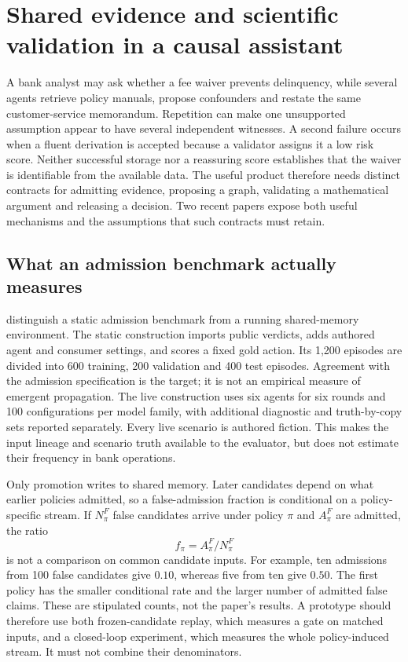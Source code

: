 \section{Shared evidence and scientific validation in a causal assistant}
\label{exec23:admit-scope}
A bank analyst may ask whether a fee waiver prevents delinquency, while several
agents retrieve policy manuals, propose confounders and restate the same
customer-service memorandum. Repetition can make one unsupported assumption
appear to have several independent witnesses. A second failure occurs when
a fluent derivation is accepted because a validator assigns it a low risk
score. Neither successful storage nor a reassuring score establishes that the
waiver is identifiable from the available data. The useful product therefore
needs distinct contracts for admitting evidence, proposing a graph, validating
a mathematical argument and releasing a decision. Two recent papers expose
both useful mechanisms and the assumptions that such contracts must retain.

\subsection{What an admission benchmark actually measures}
\label{exec23:admit-memory}
\citet{exec23_epistemic_admission} distinguish a static admission benchmark
from a running shared-memory environment. The static construction imports
public verdicts, adds authored agent and consumer settings, and scores a fixed
gold action. Its 1,200 episodes are divided into 600 training, 200 validation
and 400 test episodes. Agreement with the admission specification is the
target; it is not an empirical measure of emergent propagation. The live
construction uses six agents for six rounds and 100 configurations per model
family, with additional diagnostic and truth-by-copy sets reported separately.
Every live scenario is authored fiction. This makes the input lineage and
scenario truth available to the evaluator, but does not estimate their
frequency in bank operations.

Only promotion writes to shared memory. Later candidates depend on what
earlier policies admitted, so a false-admission fraction is conditional on a
policy-specific stream. If $N_\pi^F$ false candidates arrive under policy
$\pi$ and $A_\pi^F$ are admitted, the ratio
\begin{equation}
 f_\pi=A_\pi^F/N_\pi^F
 \label{exec23:admit-stream}
\end{equation}
is not a comparison on common candidate inputs. For example, ten admissions
from 100 false candidates give $0.10$, whereas five from ten give $0.50$. The
first policy has the smaller conditional rate and the larger number of
admitted false claims. These are stipulated counts, not the paper's results.
A prototype should therefore use both frozen-candidate replay, which measures
a gate on matched inputs, and a closed-loop experiment, which measures the
whole policy-induced stream. It must not combine their denominators.

